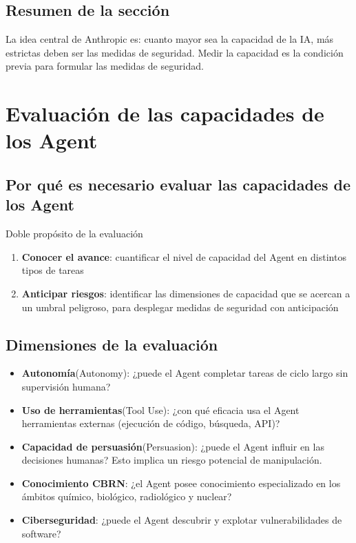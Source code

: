 \documentclass[a4paper]{article}
\begin{document}
\subsection{Resumen de la sección}

La idea central de Anthropic es: cuanto mayor sea la capacidad de la IA, más estrictas deben ser las medidas de seguridad. Medir la capacidad es la condición previa para formular las medidas de seguridad.

\section{Evaluación de las capacidades de los Agent}

\subsection{Por qué es necesario evaluar las capacidades de los Agent}

\begin{importantbox}{Doble propósito de la evaluación}
\begin{enumerate}
    \item \textbf{Conocer el avance}: cuantificar el nivel de capacidad del Agent en distintos tipos de tareas
    \item \textbf{Anticipar riesgos}: identificar las dimensiones de capacidad que se acercan a un umbral peligroso, para desplegar medidas de seguridad con anticipación
\end{enumerate}
\end{importantbox}

\subsection{Dimensiones de la evaluación}

\begin{itemize}
    \item \textbf{Autonomía}(Autonomy): ¿puede el Agent completar tareas de ciclo largo sin supervisión humana?
    \item \textbf{Uso de herramientas}(Tool Use): ¿con qué eficacia usa el Agent herramientas externas (ejecución de código, búsqueda, API)?
    \item \textbf{Capacidad de persuasión}(Persuasion): ¿puede el Agent influir en las decisiones humanas? Esto implica un riesgo potencial de manipulación.
    \item \textbf{Conocimiento CBRN}: ¿el Agent posee conocimiento especializado en los ámbitos químico, biológico, radiológico y nuclear?
    \item \textbf{Ciberseguridad}: ¿puede el Agent descubrir y explotar vulnerabilidades de software?
\end{itemize}
\end{document}
